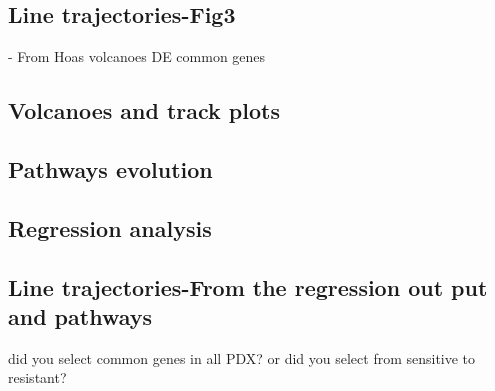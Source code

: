\subsection{Line trajectories-Fig3}
- From Hoas volcanoes DE common genes





\subsection{Volcanoes and track plots}






\subsection{Pathways evolution}




\subsection{Regression analysis}




\subsection{Line trajectories-From the regression out put and pathways}
did you select common genes in all PDX? or did you select from sensitive to resistant?
